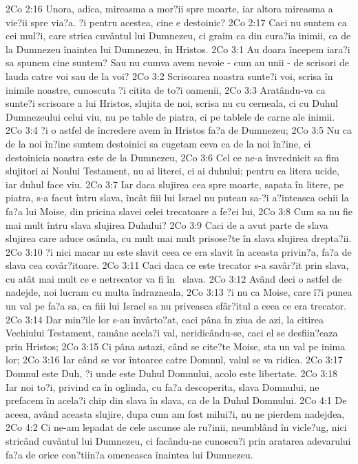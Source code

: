 2Co 2:16  Unora, adica, mireasma a mor?ii spre moarte, iar altora mireasma a vie?ii spre via?a. ?i pentru acestea, cine e destoinic?
2Co 2:17  Caci nu suntem ca cei mul?i, care strica cuvântul lui Dumnezeu, ci graim ca din cura?ia inimii, ca de la Dumnezeu înaintea lui Dumnezeu, în Hristos.
2Co 3:1  Au doara începem iara?i sa spunem cine suntem? Sau nu cumva avem nevoie - cum au unii - de scrisori de lauda catre voi sau de la voi?
2Co 3:2  Scrisoarea noastra sunte?i voi, scrisa în inimile noastre, cunoscuta ?i citita de to?i oamenii,
2Co 3:3  Aratându-va ca sunte?i scrisoare a lui Hristos, slujita de noi, scrisa nu cu cerneala, ci cu Duhul Dumnezeului celui viu, nu pe table de piatra, ci pe tablele de carne ale inimii.
2Co 3:4  ?i o astfel de încredere avem în Hristos fa?a de Dumnezeu;
2Co 3:5  Nu ca de la noi în?ine suntem destoinici sa cugetam ceva ca de la noi în?ine, ci destoinicia noastra este de la Dumnezeu,
2Co 3:6  Cel ce ne-a învrednicit sa fim slujitori ai Noului Testament, nu ai literei, ci ai duhului; pentru ca litera ucide, iar duhul face viu.
2Co 3:7  Iar daca slujirea cea spre moarte, sapata în litere, pe piatra, s-a facut întru slava, încât fiii lui Israel nu puteau sa-?i a?inteasca ochii la fa?a lui Moise, din pricina slavei celei trecatoare a fe?ei lui,
2Co 3:8  Cum sa nu fie mai mult întru slava slujirea Duhului?
2Co 3:9  Caci de a avut parte de slava slujirea care aduce osânda, cu mult mai mult prisose?te în slava slujirea drepta?ii.
2Co 3:10  ?i nici macar nu este slavit ceea ce era slavit în aceasta privin?a, fa?a de slava cea covâr?itoare.
2Co 3:11  Caci daca ce este trecator s-a savâr?it prin slava, cu atât mai mult ce e netrecator va fi în  slava.
2Co 3:12  Având deci o astfel de nadejde, noi lucram cu multa îndrazneala,
2Co 3:13  ?i nu ca Moise, care î?i punea un val pe fa?a sa, ca fiii lui Israel sa nu priveasca sfâr?itul a ceea ce era trecator.
2Co 3:14  Dar min?ile lor s-au învârto?at, caci pâna în ziua de azi, la citirea Vechiului Testament, ramâne acela?i val, neridicându-se, caci el se desfiin?eaza prin Hristos;
2Co 3:15  Ci pâna astazi, când se cite?te Moise, sta un val pe inima lor;
2Co 3:16  Iar când se vor întoarce catre Domnul, valul se va ridica.
2Co 3:17  Domnul este Duh, ?i unde este Duhul Domnului, acolo este libertate.
2Co 3:18  Iar noi to?i, privind ca în oglinda, cu fa?a descoperita, slava Domnului, ne prefacem în acela?i chip din slava în slava, ca de la Duhul Domnului.
2Co 4:1  De aceea, având aceasta slujire, dupa cum am fost milui?i, nu ne pierdem nadejdea,
2Co 4:2  Ci ne-am lepadat de cele ascunse ale ru?inii, neumblând în vicle?ug, nici stricând cuvântul lui Dumnezeu, ci facându-ne cunoscu?i prin aratarea adevarului fa?a de orice con?tiin?a omeneasca înaintea lui Dumnezeu.
